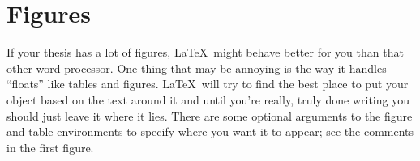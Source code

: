 \documentclass[12pt,twoside]{reedthesis}
\begin{document}


   
   \section{Figures}
   
	If your thesis has a lot of figures, \LaTeX\ might behave better for you than that other word processor.  One thing that may be annoying is the way it handles ``floats'' like tables and figures. \LaTeX\ will try to find the best place to put your object based on the text around it and until you're really, truly done writing you should just leave it where it lies.   There are some optional arguments to the figure and table environments to specify where you want it to appear; see the comments in the first figure.
\end{document}
